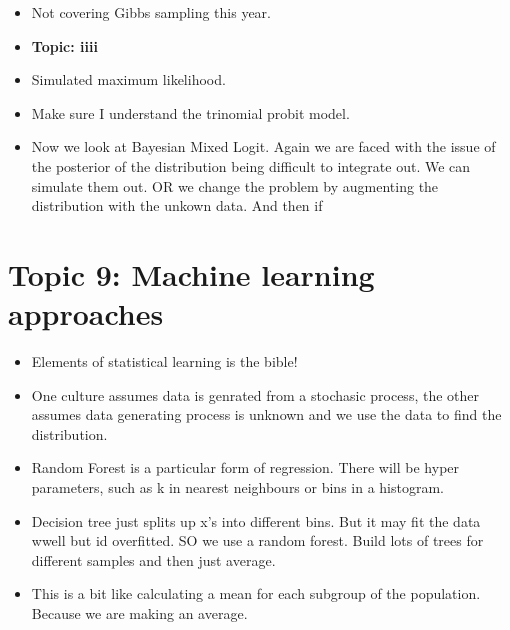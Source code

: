\documentclass[12pt]{article}
\begin{document}
\begin{itemize}
      \item Not covering Gibbs sampling this year.
      \item \textbf{Topic: iiii}
      \item Simulated maximum likelihood.
      \item Make sure I understand the trinomial probit model.
      \item Now we look at Bayesian Mixed Logit. Again we are faced with the issue of the posterior of the distribution
            being difficult to integrate out. We can simulate them out. OR we change the problem by augmenting the distribution
            with the unkown data. And then if

\end{itemize}

\section*{Topic 9: Machine learning approaches}
\begin{itemize}
      \item Elements of statistical learning is the bible!
      \item One culture assumes data is genrated from a stochasic process, the other assumes data generating process is
            unknown and we use the data to find the distribution.

      \item Random Forest is a particular form of regression. There will be hyper parameters, such as k in nearest neighbours
            or bins in a histogram.

      \item Decision tree just splits up x's into different bins. But it may fit the data wwell but id overfitted.
            SO we use a random forest. Build lots of trees for different samples and then just average.

      \item This is a bit like calculating a mean for each subgroup of the population. Because we are making
            an average.
\end{itemize}
\end{document}
